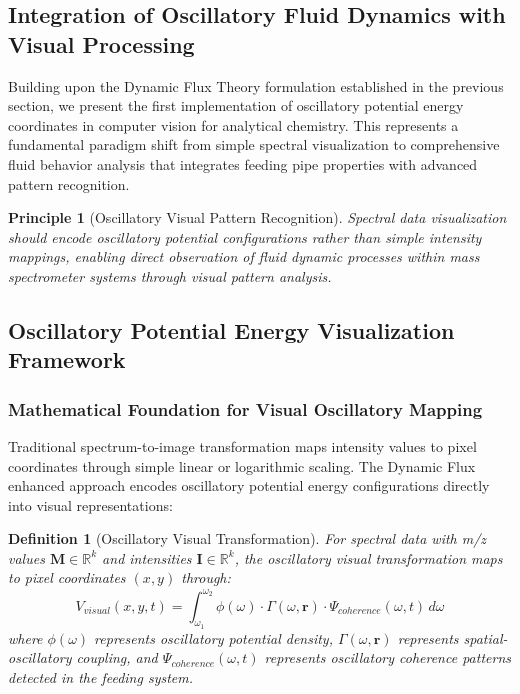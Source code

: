 \documentclass[11pt,a4paper]{article}
\newtheorem{definition}[theorem]{Definition}
\newtheorem{principle}[theorem]{Principle}
\theoremstyle{remark}
\begin{document}
\subsection{Integration of Oscillatory Fluid Dynamics with Visual Processing}

Building upon the Dynamic Flux Theory formulation established in the previous section, we present the first implementation of oscillatory potential energy coordinates in computer vision for analytical chemistry. This represents a fundamental paradigm shift from simple spectral visualization to comprehensive fluid behavior analysis that integrates feeding pipe properties with advanced pattern recognition.

\begin{principle}[Oscillatory Visual Pattern Recognition]
Spectral data visualization should encode oscillatory potential configurations rather than simple intensity mappings, enabling direct observation of fluid dynamic processes within mass spectrometer systems through visual pattern analysis.
\end{principle}

\subsection{Oscillatory Potential Energy Visualization Framework}

\subsubsection{Mathematical Foundation for Visual Oscillatory Mapping}

Traditional spectrum-to-image transformation maps intensity values to pixel coordinates through simple linear or logarithmic scaling. The Dynamic Flux enhanced approach encodes oscillatory potential energy configurations directly into visual representations:

\begin{definition}[Oscillatory Visual Transformation]
For spectral data with m/z values $\mathbf{M} \in \mathbb{R}^k$ and intensities $\mathbf{I} \in \mathbb{R}^k$, the oscillatory visual transformation maps to pixel coordinates $(x,y)$ through:
\begin{equation}
V_{visual}(x,y,t) = \int_{\omega_1}^{\omega_2} \phi(\omega) \cdot \Gamma(\omega,\mathbf{r}) \cdot \Psi_{coherence}(\omega,t) \, d\omega
\end{equation}
where $\phi(\omega)$ represents oscillatory potential density, $\Gamma(\omega,\mathbf{r})$ represents spatial-oscillatory coupling, and $\Psi_{coherence}(\omega,t)$ represents oscillatory coherence patterns detected in the feeding system.
\end{definition}
\end{document}
